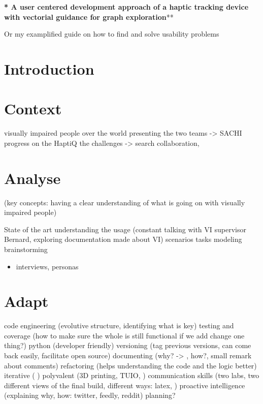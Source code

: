 \documentclass[]{article}
\date{}
\providecommand{\tightlist}{%
  \setlength{\itemsep}{0pt}\setlength{\parskip}{0pt}}
\begin{document}
\textbf{\textbf{\textbf{\textbf{\textbf{\textbf{\textbf{\textbf{\textbf{\textbf{\textbf{\textbf{\textbf{\textbf{\textbf{\textbf{\textbf{\textbf{\textbf{\textbf{\textbf{\textbf{\textbf{\textbf{\textbf{\textbf{\textbf{\textbf{\textbf{\textbf{\textbf{\textbf{\textbf{\textbf{\textbf{\textbf{\textbf{\textbf{\textbf{\textbf{\textbf{\textbf{\textbf{\textbf{\textbf{\textbf{\textbf{\textbf{\textbf{\textbf{\textbf{\textbf{\textbf{\textbf{*
A user centered development approach of a haptic tracking device with
vectorial guidance for graph
exploration}}}}}}}}}}}}}}}}}}}}}}}}}}}}}}}}}}}}}}}}}}}}}}}}}}}}}}**

Or my examplified guide on how to find and solve usability problems

\section{Introduction}\label{introduction}

\section{Context}\label{context}

visually impaired people over the world presenting the two teams
-\textgreater{} SACHI progress on the HaptiQ the challenges
-\textgreater{} search collaboration,

\section{Analyse}\label{analyse}

(key concepts: having a clear understanding of what is going on with
visually impaired people)

State of the art understanding the usage (constant talking with VI
supervisor Bernard, exploring documentation made about VI) scenarios
tasks modeling brainstorming

\begin{itemize}
\tightlist
\item
  interviews, personas
\end{itemize}

\section{Adapt}\label{adapt}

code engineering (evolutive structure, identifying what is key) testing
and coverage (how to make sure the whole is still functional if we add
change one thing?) python (developer friendly) versioning (tag previous
versions, can come back easily, facilitate open source) documenting
(why? -\textgreater{} , how?, small remark about comments) refactoring
(helps understanding the code and the logic better) iterative ( )
polyvalent (3D printing, TUIO, ) communication skills (two labs, two
different views of the final build, different ways: latex, ) proactive
intelligence (explaining why, how: twitter, feedly, reddit) planning?
\end{document}
